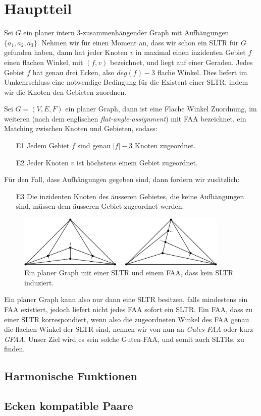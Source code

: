 \chapter{Hauptteil}

Sei $G$ ein planer intern 3-zusammenhängender Graph mit Aufhängungen $\{a_1,a_2,a_3\}$. Nehmen wir für einen Moment an, dass wir schon ein SLTR für $G$ gefunden haben, dann hat jeder Knoten $v$ in maximal einen inzidenten Gebiet $f$ einen flachen Winkel, mit $(f,v)$ bezeichnet, und liegt auf einer Geraden. Jedes Gebiet $f$ hat genau drei Ecken, also $deg(f)-3$ flache Winkel. Dies liefert im Umkehrschluss eine notwendige Bedingung für die Existent einer SLTR, indem wir die Knoten den Gebieten zuordnen.

\begin{definition}[FAA]
Sei $G=(V,E,F)$ ein planer Graph, dann ist eine Flache Winkel Zuordnung, im weiteren (nach dem englischen \textit{flat-angle-assignment}) mit FAA bezeichnet, ein Matching zwischen Knoten und Gebieten, sodass:
\begin{itemize}
\item [E1] Jedem Gebiet $f$ sind genau $|f|-3$ Knoten zugeordnet.
\item [E2] Jeder Knoten $v$ ist höchstens einem Gebiet zugeordnet.
\end{itemize}
Für den Fall, dass Aufhängungen gegeben sind, dann fordern wir zusätzlich:
\begin{itemize}
\item [E3] Die inzidenten Knoten des äusseren Gebietes, die keine Aufhängungen sind, müssen dem äusseren Gebiet zugeordnet werden.
\end{itemize}
\end{definition}

\begin{figure}
	\centering
  \includegraphics[width=0.9\textwidth]{faa_def.png}
  \caption{Ein planer Graph mit einer SLTR und einem FAA, dass kein SLTR induziert.}
\end{figure}

Ein planer Graph kann also nur dann eine SLTR besitzen, falls mindestens ein FAA existiert, jedoch liefert nicht jedes FAA sofort ein SLTR. Ein FAA, dass zu einer SLTR korrespondiert, wenn also die zugeordneten Winkel des FAA genau die flachen Winkel der SLTR sind, nennen wir von nun an \textit{Gutes-FAA} oder kurz \textit{GFAA}. Unser Ziel wird es sein solche Guten-FAA, und somit auch SLTRs, zu finden.

\section{Harmonische Funktionen}


\section{Ecken kompatible Paare}